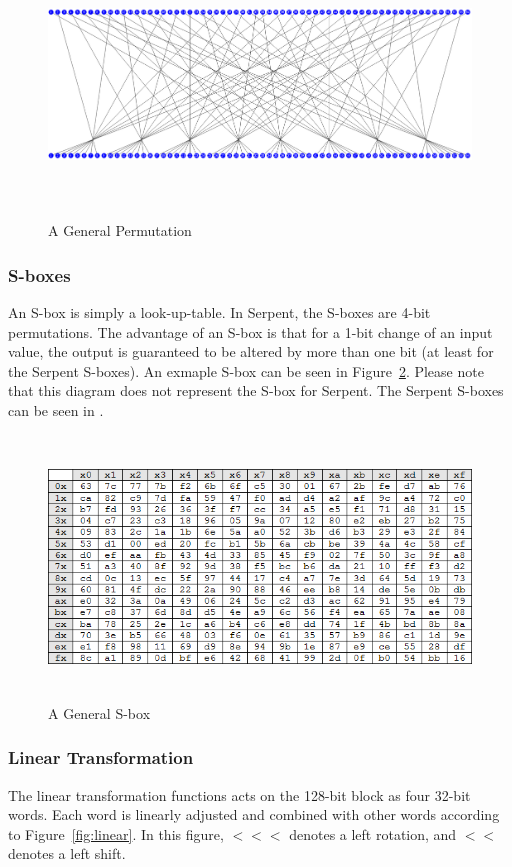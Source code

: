 \documentclass[12pt]{article} %
\begin{document}
\begin{figure}[H]
\centering
\includegraphics[width=16cm,height=7cm]{permutation}
\caption{A General Permutation}
\label{fig:permutation}
\end{figure}

\subsubsection{S-boxes}
An S-box is simply a look-up-table. In Serpent, the S-boxes are 4-bit permutations. The advantage of an S-box is that for a 1-bit change of an input value, the output is guaranteed to be altered by more than one bit (at least for the Serpent S-boxes). An exmaple S-box can be seen in Figure~\ref{fig:sbox}. Please note that this diagram does not represent the S-box for Serpent. The Serpent S-boxes can be seen in \cite{SERPENT}.

\begin{figure}[H]
\centering
\includegraphics[width=16cm,height=7cm]{sbox}
\caption{A General S-box}
\label{fig:sbox}
\end{figure}

\subsubsection{Linear Transformation}
The linear transformation functions acts on the 128-bit block as four 32-bit words. Each word is linearly adjusted and combined with other words according to Figure~\ref{fig:linear}. In this figure, $<<<$ denotes a left rotation, and $<<$ denotes a left shift.
\end{document}
